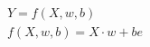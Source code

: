 \documentclass[10pt]{article}
\begin{document}
\begin{align*}Y = f(X, w, b)\\
f(X, w, b) = X \cdot w + be\end{align*}
\end{document}
